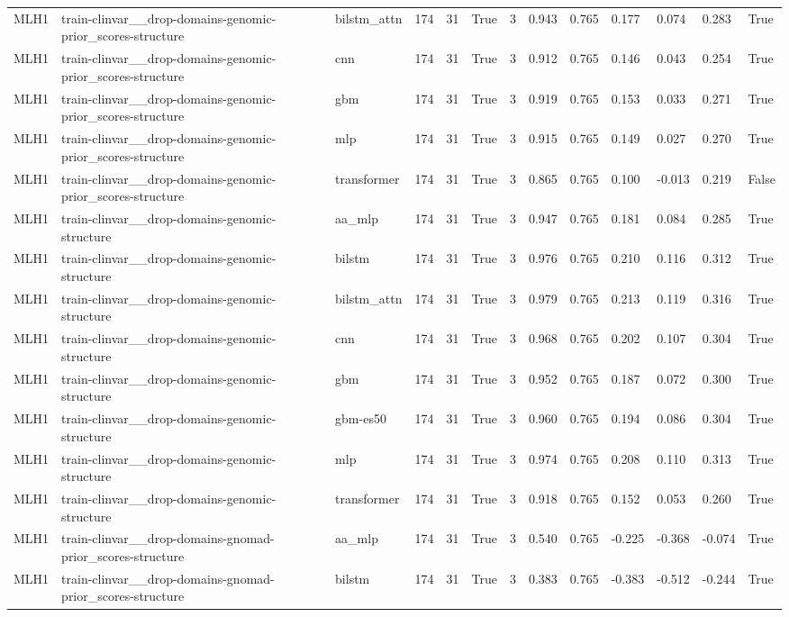 \begin{table}[t]
\begin{tabular}{lllllllllllll}
MLH1 & train-clinvar\_\_drop-domains-genomic-prior\_scores-structure & bilstm\_attn & 174 & 31 & True & 3 & 0.943 & 0.765 & 0.177 & 0.074 & 0.283 & True \\
MLH1 & train-clinvar\_\_drop-domains-genomic-prior\_scores-structure & cnn & 174 & 31 & True & 3 & 0.912 & 0.765 & 0.146 & 0.043 & 0.254 & True \\
MLH1 & train-clinvar\_\_drop-domains-genomic-prior\_scores-structure & gbm & 174 & 31 & True & 3 & 0.919 & 0.765 & 0.153 & 0.033 & 0.271 & True \\
MLH1 & train-clinvar\_\_drop-domains-genomic-prior\_scores-structure & mlp & 174 & 31 & True & 3 & 0.915 & 0.765 & 0.149 & 0.027 & 0.270 & True \\
MLH1 & train-clinvar\_\_drop-domains-genomic-prior\_scores-structure & transformer & 174 & 31 & True & 3 & 0.865 & 0.765 & 0.100 & -0.013 & 0.219 & False \\
MLH1 & train-clinvar\_\_drop-domains-genomic-structure & aa\_mlp & 174 & 31 & True & 3 & 0.947 & 0.765 & 0.181 & 0.084 & 0.285 & True \\
MLH1 & train-clinvar\_\_drop-domains-genomic-structure & bilstm & 174 & 31 & True & 3 & 0.976 & 0.765 & 0.210 & 0.116 & 0.312 & True \\
MLH1 & train-clinvar\_\_drop-domains-genomic-structure & bilstm\_attn & 174 & 31 & True & 3 & 0.979 & 0.765 & 0.213 & 0.119 & 0.316 & True \\
MLH1 & train-clinvar\_\_drop-domains-genomic-structure & cnn & 174 & 31 & True & 3 & 0.968 & 0.765 & 0.202 & 0.107 & 0.304 & True \\
MLH1 & train-clinvar\_\_drop-domains-genomic-structure & gbm & 174 & 31 & True & 3 & 0.952 & 0.765 & 0.187 & 0.072 & 0.300 & True \\
MLH1 & train-clinvar\_\_drop-domains-genomic-structure & gbm-es50 & 174 & 31 & True & 3 & 0.960 & 0.765 & 0.194 & 0.086 & 0.304 & True \\
MLH1 & train-clinvar\_\_drop-domains-genomic-structure & mlp & 174 & 31 & True & 3 & 0.974 & 0.765 & 0.208 & 0.110 & 0.313 & True \\
MLH1 & train-clinvar\_\_drop-domains-genomic-structure & transformer & 174 & 31 & True & 3 & 0.918 & 0.765 & 0.152 & 0.053 & 0.260 & True \\
MLH1 & train-clinvar\_\_drop-domains-gnomad-prior\_scores-structure & aa\_mlp & 174 & 31 & True & 3 & 0.540 & 0.765 & -0.225 & -0.368 & -0.074 & True \\
MLH1 & train-clinvar\_\_drop-domains-gnomad-prior\_scores-structure & bilstm & 174 & 31 & True & 3 & 0.383 & 0.765 & -0.383 & -0.512 & -0.244 & True \\

\end{tabular}
\end{table}
